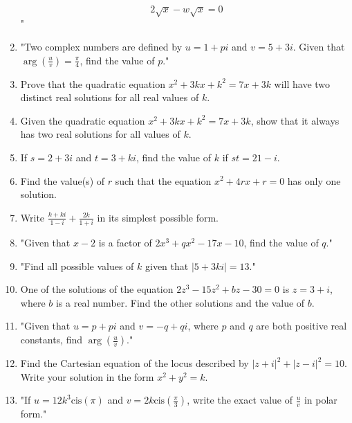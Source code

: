 \documentclass{article}
\begin{document}
\begin{enumerate}
\[ 2\sqrt{x} - w\sqrt{x} = 0 \]"
\vspace{3cm}
\item "Two complex numbers are defined by \( u = 1 + pi \) and \( v = 5 + 3i \). Given that \( \arg \left( \frac{u}{v} \right) = \frac{\pi}{4} \), find the value of \( p \)."
\vspace{3cm}
\item Prove that the quadratic equation \(x^2 + 3kx + k^2 = 7x + 3k\) will have two distinct real solutions for all real values of \(k\).
\vspace{3cm}
\item Given the quadratic equation \( x^2 + 3kx + k^2 = 7x + 3k \), show that it always has two real solutions for all values of \( k \).
\vspace{3cm}
\item If \( s = 2 + 3i \) and \( t = 3 + ki \), find the value of \( k \) if \( st = 21 - i \).
\vspace{3cm}
\item Find the value(s) of \( r \) such that the equation \( x^2 + 4rx + r = 0 \) has only one solution.
\vspace{3cm}
\item Write \(\frac{k + ki}{1 - i} + \frac{2k}{1 + i}\) in its simplest possible form.
\vspace{3cm}
\item "Given that \(x - 2\) is a factor of \(2x^3 + qx^2 - 17x - 10\), find the value of \(q\)."
\vspace{3cm}
\item "Find all possible values of \( k \) given that \(|5 + 3ki| = 13\)."
\vspace{3cm}
\item One of the solutions of the equation \(2z^3 - 15z^2 + bz - 30 = 0\) is \(z = 3 + i\), where \(b\) is a real number. Find the other solutions and the value of \(b\).
\vspace{3cm}
\item "Given that \( u = p + pi \) and \( v = -q + qi \), where \( p \) and \( q \) are both positive real constants, find \( \arg \left( \frac{u}{v} \right) \)."
\vspace{3cm}
\item Find the Cartesian equation of the locus described by \( |z + i|^2 + |z - i|^2 = 10 \). Write your solution in the form \( x^2 + y^2 = k \).
\vspace{3cm}
\item "If \( u = 12k^3 \text{cis}(\pi) \) and \( v = 2k \text{cis} \left( \frac{\pi}{3} \right) \), write the exact value of \( \frac{u}{v} \) in polar form."

\end{enumerate}
\end{document}
